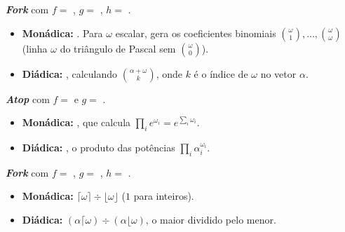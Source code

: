 {\begin{Qlist}
    \item[(b)] 

    \begin{solution}
    \textbf{\textit{Fork}} com $f=$ , $g=$ , $h=$ .
    \begin{itemize}
        \item \textbf{Monádica:} . Para $\omega$ escalar, gera os coeficientes binomiais $\binom{\omega}{1},\ldots,\binom{\omega}{\omega}$ (linha $\omega$ do triângulo de Pascal sem $\binom{\omega}{0}$).
        \item \textbf{Diádica:} , calculando $\binom{\alpha+\omega}{k}$, onde $k$ é o índice de $\omega$ no vetor $\alpha$.
    \end{itemize}
    \end{solution}

    \item[(c)] 

    \begin{solution}
    \textbf{\textit{Atop}} com $f=$  e $g=$ .
    \begin{itemize}
        \item \textbf{Monádica:} , que calcula $\prod_i e^{\omega_i}=e^{\sum_i\omega_i}$.
        \item \textbf{Diádica:} , o produto das potências $\prod_i \alpha_i^{\omega_i}$.
    \end{itemize}
    \end{solution}

    \item[(d)] 

    \begin{solution}
    \textbf{\textit{Fork}} com $f=$ , $g=$ , $h=$ .
    \begin{itemize}
        \item \textbf{Monádica:} $\lceil\omega\rceil\div\lfloor\omega\rfloor$ ($1$ para inteiros).
        \item \textbf{Diádica:} $(\alpha\lceil\omega)\div(\alpha\lfloor\omega)$, o maior dividido pelo menor.
    \end{itemize}
    \end{solution}

    \item[(e)] 


\end{Qlist}}
